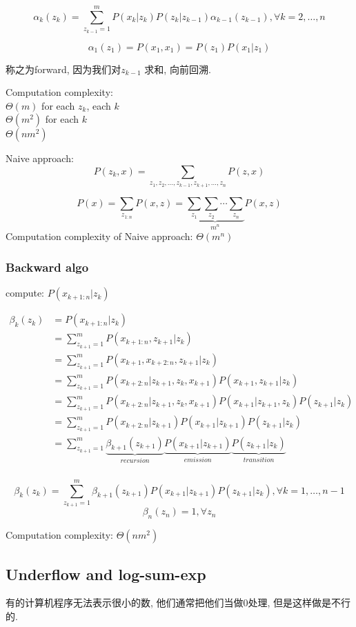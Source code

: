 \documentclass{article}
\begin{document}
$$ \alpha_k(z_k) = \sum_{z_{k-1} = 1}^m P(x_k|z_k) P(z_k| z_{k-1}) \alpha_{k-1}(z_{k-1}), \forall k=2,\ldots, n $$

$$\alpha_1(z_1) = P(x_1, x_1) = P(z_1) P(x_1|z_1)$$

称之为forward, 因为我们对$z_{k-1}$ 求和, 向前回溯.

Computation complexity:\\
$\Theta(m)$ for each $z_k$, each $k$ \\
$\Theta(m^2)$ for each $k$ \\
$\Theta(n m^2)$

Naive approach:
$$ P(z_k,x) = \sum_{z_1, z_2, \ldots, z_{k-1}, z_{k+1}, \ldots, z_n} P(z, x)$$

$$ 
P(x) 
= \sum_{z_{1:n}} P(x,z) 
= \underbrace{\sum_{z_1} \sum_{z_2} \cdots \sum_{z_n}}_{m^n} P(x,z) 
$$
Computation complexity of Naive approach: $\Theta(m^n)$

\subsubsection{Backward algo}
compute: $P(x_{k+1:n}|z_k)$

$$
\begin{aligned}
\beta_k(z_k)
& = P(x_{k+1:n}|z_k) \\
& = \sum_{z_{k+1} = 1}^m P(x_{k+1:n}, z_{k+1}|z_k) \\
& = \sum_{z_{k+1} = 1}^m P(x_{k+1}, x_{k+2:n}, z_{k+1}|z_k) \\
& = \sum_{z_{k+1} = 1}^m P(x_{k+2:n}|z_{k+1}, z_k, x_{k+1}) P(x_{k+1}, z_{k+1}| z_k) \\
& = \sum_{z_{k+1} = 1}^m P(x_{k+2:n}|z_{k+1}, z_k, x_{k+1}) P(x_{k+1}| z_{k+1}, z_k) P(z_{k+1}|z_k) \\
& = \sum_{z_{k+1} = 1}^m P(x_{k+2:n}|z_{k+1}) P(x_{k+1}| z_{k+1}) P(z_{k+1}|z_k) \\
& = \sum_{z_{k+1} = 1}^m \underbrace{\beta_{k+1}(z_{k+1})}_{recursion} \underbrace{P(x_{k+1}| z_{k+1})}_{emission} \underbrace{P(z_{k+1}|z_k)}_{transition} \\
\end{aligned}
$$

$$ \beta_k(z_k) = \sum_{z_{k+1} = 1}^m \beta_{k+1}(z_{k+1}) P(x_{k+1}| z_{k+1}) P(z_{k+1}|z_k), \forall k = 1, \ldots, n-1 $$
$$\beta_n(z_n) = 1, \forall z_n$$

Computation complexity: $\Theta(n m^2)$

\subsection{Underflow and log-sum-exp}
有的计算机程序无法表示很小的数, 他们通常把他们当做$0$处理, 但是这样做是不行的.
\end{document}
